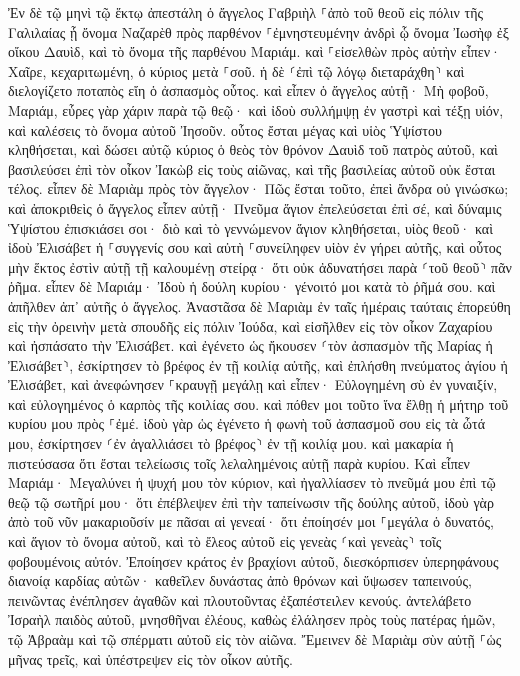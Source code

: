 \documentclass[twoside, 9pt]{extreport}
\begin{document}
Ἐν δὲ τῷ μηνὶ τῷ ἕκτῳ ἀπεστάλη ὁ ἄγγελος Γαβριὴλ ⸀ἀπὸ τοῦ θεοῦ εἰς πόλιν τῆς Γαλιλαίας ᾗ ὄνομα Ναζαρὲθ 
πρὸς παρθένον ⸀ἐμνηστευμένην ἀνδρὶ ᾧ ὄνομα Ἰωσὴφ ἐξ οἴκου Δαυὶδ, καὶ τὸ ὄνομα τῆς παρθένου Μαριάμ. 
καὶ ⸀εἰσελθὼν πρὸς αὐτὴν εἶπεν· Χαῖρε, κεχαριτωμένη, ὁ κύριος μετὰ ⸀σοῦ. 
ἡ δὲ ⸂ἐπὶ τῷ λόγῳ διεταράχθη⸃ καὶ διελογίζετο ποταπὸς εἴη ὁ ἀσπασμὸς οὗτος. 
καὶ εἶπεν ὁ ἄγγελος αὐτῇ· Μὴ φοβοῦ, Μαριάμ, εὗρες γὰρ χάριν παρὰ τῷ θεῷ· 
καὶ ἰδοὺ συλλήμψῃ ἐν γαστρὶ καὶ τέξῃ υἱόν, καὶ καλέσεις τὸ ὄνομα αὐτοῦ Ἰησοῦν. 
οὗτος ἔσται μέγας καὶ υἱὸς Ὑψίστου κληθήσεται, καὶ δώσει αὐτῷ κύριος ὁ θεὸς τὸν θρόνον Δαυὶδ τοῦ πατρὸς αὐτοῦ, 
καὶ βασιλεύσει ἐπὶ τὸν οἶκον Ἰακὼβ εἰς τοὺς αἰῶνας, καὶ τῆς βασιλείας αὐτοῦ οὐκ ἔσται τέλος. 
εἶπεν δὲ Μαριὰμ πρὸς τὸν ἄγγελον· Πῶς ἔσται τοῦτο, ἐπεὶ ἄνδρα οὐ γινώσκω; 
καὶ ἀποκριθεὶς ὁ ἄγγελος εἶπεν αὐτῇ· Πνεῦμα ἅγιον ἐπελεύσεται ἐπὶ σέ, καὶ δύναμις Ὑψίστου ἐπισκιάσει σοι· διὸ καὶ τὸ γεννώμενον ἅγιον κληθήσεται, υἱὸς θεοῦ· 
καὶ ἰδοὺ Ἐλισάβετ ἡ ⸀συγγενίς σου καὶ αὐτὴ ⸀συνείληφεν υἱὸν ἐν γήρει αὐτῆς, καὶ οὗτος μὴν ἕκτος ἐστὶν αὐτῇ τῇ καλουμένῃ στείρᾳ· 
ὅτι οὐκ ἀδυνατήσει παρὰ ⸂τοῦ θεοῦ⸃ πᾶν ῥῆμα. 
εἶπεν δὲ Μαριάμ· Ἰδοὺ ἡ δούλη κυρίου· γένοιτό μοι κατὰ τὸ ῥῆμά σου. καὶ ἀπῆλθεν ἀπ᾽ αὐτῆς ὁ ἄγγελος. 
Ἀναστᾶσα δὲ Μαριὰμ ἐν ταῖς ἡμέραις ταύταις ἐπορεύθη εἰς τὴν ὀρεινὴν μετὰ σπουδῆς εἰς πόλιν Ἰούδα, 
καὶ εἰσῆλθεν εἰς τὸν οἶκον Ζαχαρίου καὶ ἠσπάσατο τὴν Ἐλισάβετ. 
καὶ ἐγένετο ὡς ἤκουσεν ⸂τὸν ἀσπασμὸν τῆς Μαρίας ἡ Ἐλισάβετ⸃, ἐσκίρτησεν τὸ βρέφος ἐν τῇ κοιλίᾳ αὐτῆς, καὶ ἐπλήσθη πνεύματος ἁγίου ἡ Ἐλισάβετ, 
καὶ ἀνεφώνησεν ⸀κραυγῇ μεγάλῃ καὶ εἶπεν· Εὐλογημένη σὺ ἐν γυναιξίν, καὶ εὐλογημένος ὁ καρπὸς τῆς κοιλίας σου. 
καὶ πόθεν μοι τοῦτο ἵνα ἔλθῃ ἡ μήτηρ τοῦ κυρίου μου πρὸς ⸀ἐμέ. 
ἰδοὺ γὰρ ὡς ἐγένετο ἡ φωνὴ τοῦ ἀσπασμοῦ σου εἰς τὰ ὦτά μου, ἐσκίρτησεν ⸂ἐν ἀγαλλιάσει τὸ βρέφος⸃ ἐν τῇ κοιλίᾳ μου. 
καὶ μακαρία ἡ πιστεύσασα ὅτι ἔσται τελείωσις τοῖς λελαλημένοις αὐτῇ παρὰ κυρίου. 
Καὶ εἶπεν Μαριάμ· Μεγαλύνει ἡ ψυχή μου τὸν κύριον, 
καὶ ἠγαλλίασεν τὸ πνεῦμά μου ἐπὶ τῷ θεῷ τῷ σωτῆρί μου· 
ὅτι ἐπέβλεψεν ἐπὶ τὴν ταπείνωσιν τῆς δούλης αὐτοῦ, ἰδοὺ γὰρ ἀπὸ τοῦ νῦν μακαριοῦσίν με πᾶσαι αἱ γενεαί· 
ὅτι ἐποίησέν μοι ⸀μεγάλα ὁ δυνατός, καὶ ἅγιον τὸ ὄνομα αὐτοῦ, 
καὶ τὸ ἔλεος αὐτοῦ εἰς γενεὰς ⸂καὶ γενεὰς⸃ τοῖς φοβουμένοις αὐτόν. 
Ἐποίησεν κράτος ἐν βραχίονι αὐτοῦ, διεσκόρπισεν ὑπερηφάνους διανοίᾳ καρδίας αὐτῶν· 
καθεῖλεν δυνάστας ἀπὸ θρόνων καὶ ὕψωσεν ταπεινούς, 
πεινῶντας ἐνέπλησεν ἀγαθῶν καὶ πλουτοῦντας ἐξαπέστειλεν κενούς. 
ἀντελάβετο Ἰσραὴλ παιδὸς αὐτοῦ, μνησθῆναι ἐλέους, 
καθὼς ἐλάλησεν πρὸς τοὺς πατέρας ἡμῶν, τῷ Ἀβραὰμ καὶ τῷ σπέρματι αὐτοῦ εἰς τὸν αἰῶνα. 
Ἔμεινεν δὲ Μαριὰμ σὺν αὐτῇ ⸀ὡς μῆνας τρεῖς, καὶ ὑπέστρεψεν εἰς τὸν οἶκον αὐτῆς. 
\end{document}
